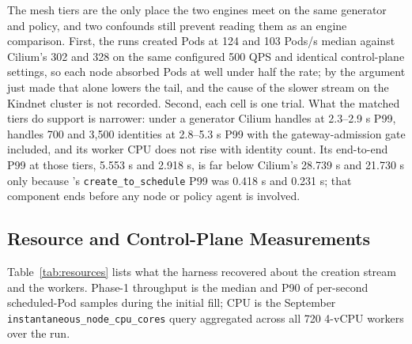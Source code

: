 The mesh tiers are the only place the two engines meet on the same
generator and policy, and two confounds still prevent reading them as an
engine comparison. First, the \sys{} runs created Pods at 124 and 103
Pods/s median against Cilium's 302 and 328 on the same configured 500
QPS and identical control-plane settings, so each \sys{} node absorbed
Pods at well under half the rate; by the argument just made that alone
lowers the tail, and the cause of the slower stream on the Kindnet
cluster is not recorded. Second, each cell is one trial. What the matched
tiers do support is narrower: under a generator Cilium handles at
2.3--2.9 s P99, \sys{} handles 700 and 3,500 identities at 2.8--5.3 s
P99 with the gateway-admission gate included, and its worker CPU does not
rise with identity count. Its end-to-end P99 at those tiers, 5.553 s and
2.918 s, is far below Cilium's 28.739 s and 21.730 s only because
\sys{}'s \texttt{create\_to\_schedule} P99 was 0.418 s and 0.231 s; that
component ends before any node or policy agent is involved.

\subsection{Resource and Control-Plane Measurements}
\label{sec:eval-resources}
Table~\ref{tab:resources} lists what the harness recovered about the
creation stream and the workers. Phase-1 throughput is the median and
P90 of per-second scheduled-Pod samples during the initial fill; CPU is
the September \texttt{instantaneous\_node\_cpu\_cores} query aggregated
across all 720 4-vCPU workers over the run.

